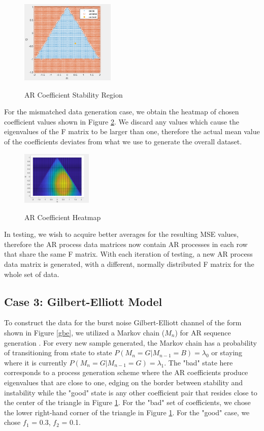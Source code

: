 \documentclass[twocolumn,letterpaper]{IEEEAerospaceCLS}  %
\begin{document}
\begin{figure}[!h]
	\centering\includegraphics[width=0.4\textwidth]{figs/stability.png}\\
	\caption{AR Coefficient Stability Region}
	\label{stabf1f2}
\end{figure}

For the mismatched data generation case, we obtain the heatmap of chosen coefficient values shown in Figure \ref{heatmap}. We discard any values which cause the eigenvalues of the F matrix to be larger than one, therefore the actual mean value of the coefficients deviates from what we use to generate the overall dataset. 

\begin{figure}[!h]
\centering\includegraphics[width=0.3\textwidth]{figs/heatmap.PNG}\\
\caption{AR Coefficient Heatmap}
\label{heatmap}
\end{figure}

In testing, we wish to acquire better averages for the resulting MSE values, therefore the AR process data matrices now contain AR processes in each row that share the same F matrix. With each iteration of testing, a new AR process data matrix is generated, with a different, normally distributed F matrix for the whole set of data.  

\subsection{Case 3: Gilbert-Elliott Model}

To construct the data for the burst noise Gilbert-Elliott channel of the form shown in Figure \ref{gbe}, we utilized a Markov chain ($M_n$) for AR sequence generation \cite{laourine2010betting}. For every new sample generated, the Markov chain has a probability of transitioning from state to state $P(M_n = G | M_{n-1} = B) = \lambda_0$ or staying where it is currently $P(M_n = G | M_{n-1} = G) = \lambda_1$. The "bad" state here corresponds to a process generation scheme where the AR coefficients produce eigenvalues that are close to one, edging on the border between stability and instability while the "good" state is any other coefficient pair that resides close to the center of the triangle in Figure \ref{stabf1f2}. For the "bad" set of coefficients, we chose the lower right-hand corner of the triangle in Figure \ref{stabf1f2}. For the "good" case, we chose $f_1$ = 0.3, $f_2$ = 0.1.
\end{document}
